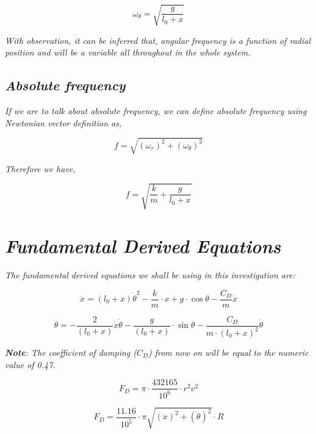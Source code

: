             $$\omega_\theta = \sqrt{\frac{g}{l_0 + x}}$$
                
        \textit{With observation, it can be inferred that, angular frequency is a function of radial position and will be a variable all throughout in the whole system.}
                
    \subsection{\textit{Absolute frequency}}
                
        \textit{If we are to talk about absolute frequency, we can define absolute frequency using Newtonian vector definition as,}
                
            $$f = \sqrt{\left(\omega_r\right)^2 + \left(\omega_\theta\right)^2}$$
                
        \textit{Therefore we have,}
                
            $$f = \sqrt{\frac{k}{m} + \frac{g}{l_0 + x}}$$



\section{\textit{Fundamental Derived Equations}}
\textit{The fundamental derived equations we shall be using in this investigation are:}
            
    \begin{equation}
        \ddot{x} = (l_0+x)\dot{\theta}^2 - \frac{k}{m}\cdot x + g\cdot\cos{\theta} - \frac{C_D}{m}\dot{x}
        \label{eq1}
    \end{equation}
            
    \begin{equation}
        \ddot{\theta} = - \frac{2}{(l_0+x)}\dot{x}\dot{\theta} - \frac{g}{(l_0+x)}\cdot\sin{\theta} - \frac{C_D}{m\cdot(l_0+x)^2}\dot{\theta}
    \label{eq2}
    \end{equation}
            
        \textit{\textbf{Note}: The coefficient of damping ($C_D$) from now on will be equal to the numeric value of 0.47.}
            
    \begin{equation}
        F_D = \pi\cdot\frac{432165}{10^{6}}\cdot r^2v^2
        \label{eq3}
    \end{equation}
            
    \begin{equation}
        F_D = \frac{11.16}{10^{5}}\cdot\pi\sqrt{(\ddot{x})^2 + (\ddot{\theta})^2}\cdot R
        \label{eq4}
    \end{equation}
            
